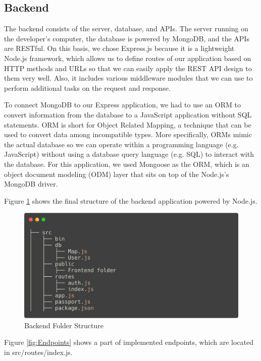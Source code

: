 \begin{enumerate}
\end{enumerate}

\subsection{Backend}
The backend consists of the server, database, and APIs. The server running on the developer's computer, the database is powered by MongoDB, and the APIs are RESTful. On this basis, we chose Express.js because it is a lightweight Node.js framework, which allows us to define routes of our application based on HTTP methods and URLs so that we can easily apply the REST API design to them very well. Also, it includes various middleware modules that we can use to perform additional tasks on the request and response.

To connect MongoDB to our Express application, we had to use an ORM to convert information from the database to a JavaScript application without SQL statements. ORM is short for Object Related Mapping, a technique that can be used to convert data among incompatible types. More specifically, ORMs mimic the actual database so we can operate within a programming language (e.g. JavaScript) without using a database query language (e.g. SQL) to interact with the database. For this application, we used Mongoose as the ORM, which is an object document modeling (ODM) layer that sits on top of the Node.js's MongoDB driver.

Figure \ref{fig:Backend Folder Structure} shows the final structure of the backend application powered by Node.js.

\begin{figure}[htbp]
  \includegraphics[width=\textwidth]{section04/assets/Backend.png}
  \caption{Backend Folder Structure}
  \label{fig:Backend Folder Structure}
\end{figure}

Figure \ref{fig:Endpoints} shows a part of implemented endpoints, which are located in src/routes/index.js.

